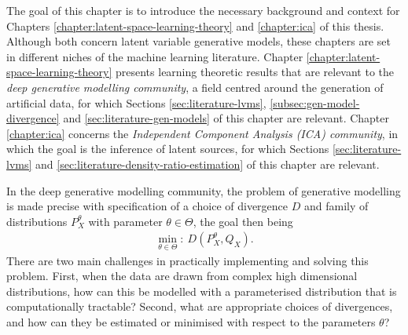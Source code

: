 The goal of this chapter is to introduce the necessary background and context for Chapters \ref{chapter:latent-space-learning-theory} and \ref{chapter:ica} of this thesis.
Although both concern latent variable generative models, these chapters are set in different niches of the machine learning literature.
Chapter \ref{chapter:latent-space-learning-theory} presents learning theoretic results that are relevant to the \emph{deep generative modelling community}, 
a field centred around the generation of artificial data, for which Sections \ref{sec:literature-lvms}, \ref{subsec:gen-model-divergence} and \ref{sec:literature-gen-models} of this chapter are relevant.
Chapter \ref{chapter:ica} concerns the \emph{Independent Component Analysis (ICA) community}, in which the goal is the inference of latent sources, for which Sections \ref{sec:literature-lvms} and \ref{sec:literature-density-ratio-estimation} of this chapter are relevant.








In the deep generative modelling community, the problem of generative modelling is made precise with specification of a choice of divergence
$D$ and family of distributions $P_X^\theta$ with parameter $\theta\in\Theta$, the goal then being
%
\begin{align}\label{eqn:chap-2-generative-modelling}
\min_{\theta \in \Theta}: \ D\left(P_X^\theta,  Q_X \right).
\end{align}
%
There are two main challenges in practically implementing and solving this problem.
First, when the data are drawn from complex high dimensional distributions, how can this be modelled with a parameterised distribution that is computationally tractable?
Second, what are appropriate choices of divergences, and how can they be estimated or minimised with respect to the parameters $\theta$?

